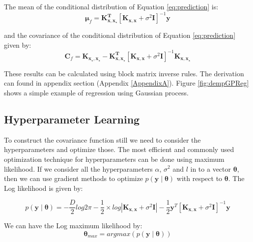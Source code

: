The mean of the conditional distribution of Equation \ref{eq:prediction} is:
\begin{equation} \label{eq:prediction_mean}
  \boldsymbol{\mu}_f = \mathbf{K_{x,x_\star}^T} \left[ \mathbf{K_{x,x}}+ \sigma^2\mathbf{I} \right]^{-1} \mathbf{y}
\end{equation}

and the covariance of the conditional distribution of Equation \ref{eq:prediction} given by:
\begin{equation} \label{eq:prediction_cov}
  \mathbf{C}_f = \mathbf{K_{x_\star,x_\star}} -
		\mathbf{K_{x,x_\star}^T} \left[ \mathbf{K_{x,x}}+ \sigma^2\mathbf{I} \right]^{-1} \mathbf{K_{x,x_\star}}
\end{equation}

These results can be calculated using block matrix inverse rules. The derivation can found 
in appendix section (Appendix \ref{AppendixA}). Figure \ref{fig:dempGPReg} shows a simple example of regression
using Gaussian process.

\subsection{Hyperparameter Learning}
To construct the covariance function
still we need to consider the hyperparameters and optimize those. The most efficient and commonly used 
optimization technique for hyperparameters can be done using maximum likelihood. If we consider all the hyperparameters
$\alpha$, $\sigma^2$ and $l$ in to a vector $\boldsymbol{\theta}$, then we can use gradient methods to optimize
$p \left(\mathbf{y}\middle|\boldsymbol{\theta}\right)$ with respect to $\boldsymbol{\theta}$. The Log
likelihood is given by:

\begin{equation} \label{eq:Likelihood}
 p \left(\mathbf{y}\middle|\boldsymbol{\theta}\right) =
    - \frac{D}{2}log2\pi - \frac{1}{2}\times log \left| \mathbf{K_{x,x}} + \sigma^2\mathbf{I}\right|
    - \frac{1}{2}\mathbf{y}^T \left[\mathbf{K_{x,x}} + \sigma^2\mathbf{I} \right]^{-1}\mathbf{y}
\end{equation}

We can have the Log maximum likelihood by:
\begin{equation} \label{eq:LML}
 \boldsymbol{\theta}_{max} = argmax \left( p\left(\mathbf{y}\middle|\boldsymbol{\theta}\right) \right)
\end{equation}

